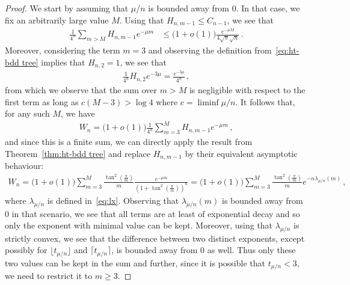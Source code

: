 \documentclass{article}
\newcommand{\1}{\mathbbm{1}}								%
\theoremstyle{definition}
\numberwithin{equation}{section}
\begin{document}
\begin{proof}
    We start by assuming that $\mu/n$ is bounded away from $0$.
    In that case, we fix an arbitrarily large value $M$.
    Using that $H_{n,m-1}\leq C_{n-1}$, we see that
    \begin{align*}
        \frac{1}{4^n}\sum_{m>M}H_{n,m-1}e^{-\mu m}&\leq\big(1+o(1)\big)\frac{e^{-\mu M}}{4\sqrt{\pi}\sqrt{n}}\,.
    \end{align*}
    Moreover, considering the term $m=3$ and observing the definition from~\eqref{eq:ht-bdd tree} implies that $H_{n,2}=1$, we see that
    \begin{align*}
        \frac{1}{4^n}H_{n,2}e^{-3\mu}=\frac{e^{-3\mu}}{4^n}\,,
    \end{align*}
    from which we observe that the sum over $m>M$ is negligible with respect to the first term as long as $c(M-3)>\log4$ where $c=\liminf\mu/n$.
    It follows that, for any such $M$, we have
    \begin{align*}
        W_n=\big(1+o(1)\big)\frac{1}{4^n}\sum_{m=3}^MH_{n,m-1}e^{-\mu m}\,,
    \end{align*}
    and since this is a finite sum, we can directly apply the result from Theorem~\ref{thm:ht-bdd tree} and replace $H_{n,m-1}$ by their equivalent asymptotic behaviour:
    \begin{align*}
        W_n=\big(1+o(1)\big)\sum_{m=3}^M\frac{\tan^2\left(\frac{\pi}{m}\right)}{m}\frac{e^{-\mu m}}{\left(1+\tan^2\left(\frac{\pi}{m}\right)\right)^n}=\big(1+o(1)\big)\sum_{m=3}^M\frac{\tan^2\left(\frac{\pi}{m}\right)}{m}e^{-n\lambda_{\mu/n}(m)}\,,
    \end{align*}
    where $\lambda_{\mu/n}$ is defined in~\eqref{eq:lx}.
    Observing that $\lambda_{\mu/n}(m)$ is bounded away from $0$ in that scenario, we see that all terms are at least of exponential decay and so only the exponent with minimal value can be kept.
    Moreover, using that $\lambda_{\mu/n}$ is strictly convex, we see that the difference between two distinct exponents, except possibly for $\lfloor t_{\mu/n}\rfloor$ and $\lceil t_{\mu/n}\rceil$, is bounded away from $0$ as well.
    Thus only these two values can be kept in the sum and further, since it is possible that $t_{\mu/n}<3$, we need to restrict it to $m\geq3$.


\end{proof}
\end{document}
